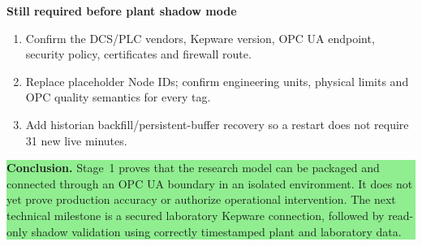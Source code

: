 \documentclass[11pt,a4paper]{article}
\begin{document}
\textbf{Still required before plant shadow mode}
\begin{enumerate}
  \item Confirm the DCS/PLC vendors, Kepware version, OPC UA endpoint, security policy, certificates and firewall route.
  \item Replace placeholder Node IDs; confirm engineering units, physical limits and OPC quality semantics for every tag.
  \item Add historian backfill/persistent-buffer recovery so a restart does not require 31 new live minutes.
\end{enumerate}

\begin{center}
\colorbox{lightgreen}{\parbox{0.91\textwidth}{
\textbf{Conclusion.} Stage~1 proves that the research model can be packaged and connected through an OPC UA boundary in an isolated environment. It does not yet prove production accuracy or authorize operational intervention. The next technical milestone is a secured laboratory Kepware connection, followed by read-only shadow validation using correctly timestamped plant and laboratory data.
}}
\end{center}
\end{document}
